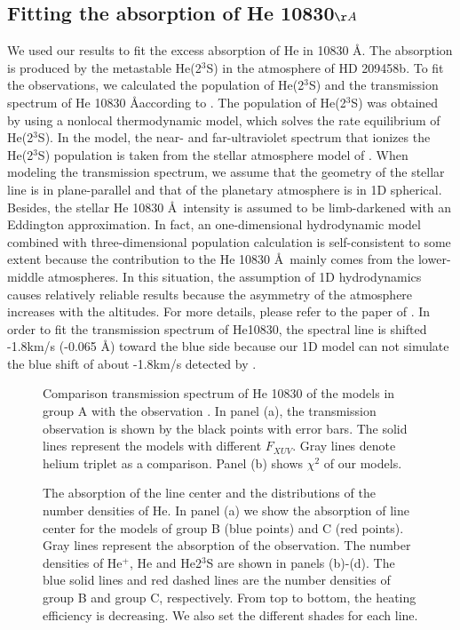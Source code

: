 \documentclass[journal, onecolumn]{aastex631}
\begin{document}
\begin{CJK*}{UTF8}{gbsn}
\subsection{Fitting the absorption of He 10830${\AA}$}\label{subsec:observation}
We used our results to fit the excess absorption of He in 10830 \AA. The absorption is produced by the metastable He(2$^3$S) in the atmosphere of HD 209458b. To fit the observations, we calculated the population of He(2$^3$S) and the transmission spectrum of He 10830 Åaccording to \cite{Yan2022}. The population of He(2$^3$S) was obtained by using a nonlocal thermodynamic model, which solves the rate equilibrium of He(2$^3$S). In the model, the near- and far-ultraviolet spectrum that ionizes the He(2$^3$S) population is taken from the stellar atmosphere model of \cite{Castelli2003}. When modeling the transmission spectrum, we assume that the geometry of the stellar line is in plane-parallel and that of the planetary atmosphere is in 1D spherical. Besides, the stellar He 10830 \AA \ intensity is assumed to be limb-darkened with an Eddington approximation. In fact, an one-dimensional hydrodynamic model combined with three-dimensional population calculation is self-consistent to some extent because the contribution to the He 10830 \AA \ mainly comes from the lower-middle atmospheres. In this situation, the assumption of 1D hydrodynamics causes relatively reliable results because the asymmetry of the atmosphere increases with the altitudes. For more details, please refer to the paper of \cite{Yan2022}. In order to fit the transmission spectrum of He10830, the spectral line is shifted -1.8km/s (-0.065 \AA) toward the blue side because our 1D model can not simulate the blue shift of about -1.8km/s detected by \cite{Alonso2019}.


\begin{figure}[ht!]
\caption{Comparison transmission spectrum of He 10830 of the models in group A with the observation \citep{Alonso2019}. In panel (a), the transmission observation is shown by the black points with error bars. The solid lines represent the models with different $F_{XUV}$. Gray lines denote helium triplet as a comparison. Panel (b) shows $\chi^2$ of our models.}
\label{fig:fit_ob}
\end{figure}

\begin{figure}[ht!]
\caption{The absorption of the line center and the distributions of the number densities of He. In panel (a) we show the absorption of line center for the models of group B (blue points) and C (red points). Gray lines represent the absorption of the observation. The number densities of He$^+$, He and He2$^3$S are shown in panels (b)-(d). The blue solid lines and red dashed lines are the number densities of group B and group C, respectively. From top to bottom, the heating efficiency is decreasing. We also set the different shades for each line.}
\label{fig:he_saturate}
\end{figure}



\end{CJK*}
\end{document}
